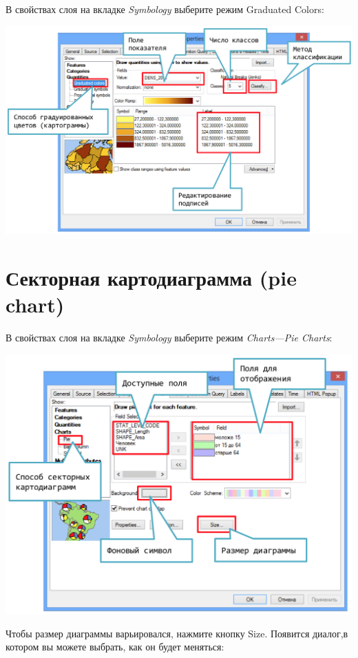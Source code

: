 \documentclass[]{book}
\theoremstyle{definition}
\theoremstyle{definition}
\theoremstyle{definition}
\theoremstyle{remark}
\begin{document}
В свойствах слоя на вкладке \emph{Symbology} выберите режим Graduated
Colors:

\includegraphics{images/Appendix/image21.png}

\hypertarget{--pie-chart}{%
\section{Секторная картодиаграмма (pie chart)}\label{--pie-chart}}

В свойствах слоя на вкладке \emph{Symbology} выберите режим
\emph{Charts---Pie Charts}:

\includegraphics{images/Appendix/image22.png}

Чтобы размер диаграммы варьировался, нажмите кнопку Size. Появится
диалог,в котором вы можете выбрать, как он будет меняться:
\end{document}
